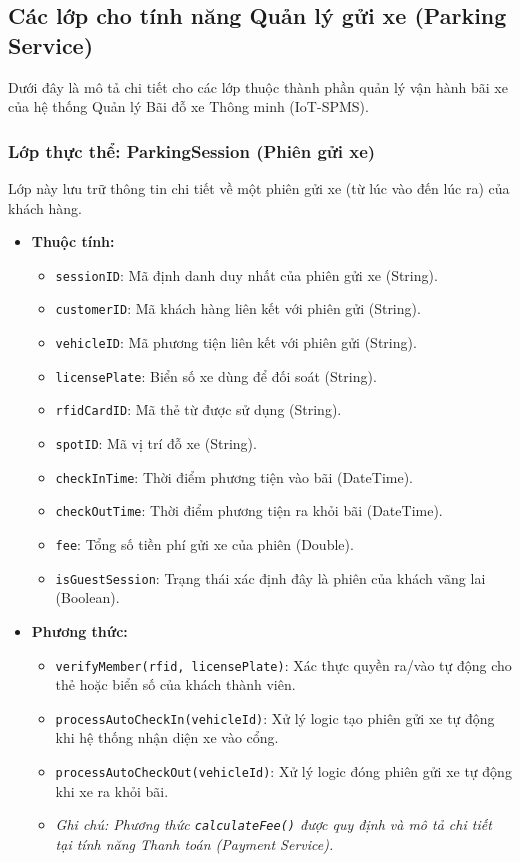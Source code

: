 \subsection{Các lớp cho tính năng Quản lý gửi xe (Parking Service)}

Dưới đây là mô tả chi tiết cho các lớp thuộc thành phần quản lý vận hành bãi xe của hệ thống Quản lý Bãi đỗ xe Thông minh (IoT-SPMS).

\subsubsection{Lớp thực thể: ParkingSession (Phiên gửi xe)}
Lớp này lưu trữ thông tin chi tiết về một phiên gửi xe (từ lúc vào đến lúc ra) của khách hàng.

\begin{itemize}
    \item \textbf{Thuộc tính:}
    \begin{itemize}
        \item \texttt{sessionID}: Mã định danh duy nhất của phiên gửi xe (String).
        \item \texttt{customerID}: Mã khách hàng liên kết với phiên gửi (String).
        \item \texttt{vehicleID}: Mã phương tiện liên kết với phiên gửi (String).
        \item \texttt{licensePlate}: Biển số xe dùng để đối soát (String).
        \item \texttt{rfidCardID}: Mã thẻ từ được sử dụng (String).
        \item \texttt{spotID}: Mã vị trí đỗ xe (String).
        \item \texttt{checkInTime}: Thời điểm phương tiện vào bãi (DateTime).
        \item \texttt{checkOutTime}: Thời điểm phương tiện ra khỏi bãi (DateTime).
        \item \texttt{fee}: Tổng số tiền phí gửi xe của phiên (Double).
        \item \texttt{isGuestSession}: Trạng thái xác định đây là phiên của khách vãng lai (Boolean).
    \end{itemize}
    \item \textbf{Phương thức:}
    \begin{itemize}
        \item \texttt{verifyMember(rfid, licensePlate)}: Xác thực quyền ra/vào tự động cho thẻ hoặc biển số của khách thành viên.
        \item \texttt{processAutoCheckIn(vehicleId)}: Xử lý logic tạo phiên gửi xe tự động khi hệ thống nhận diện xe vào cổng.
        \item \texttt{processAutoCheckOut(vehicleId)}: Xử lý logic đóng phiên gửi xe tự động khi xe ra khỏi bãi.
        \item \textit{Ghi chú: Phương thức \texttt{calculateFee()} được quy định và mô tả chi tiết tại tính năng Thanh toán (Payment Service).}
    \end{itemize}
\end{itemize}

